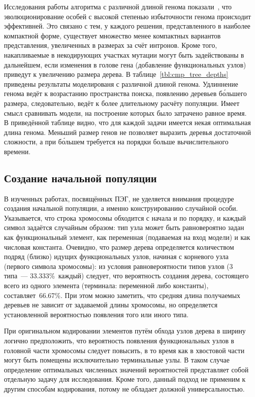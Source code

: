 Исследования работы алгоритма с различной длиной генома показали~\cite{journals/advcs/Ferreira02}, что эволюционирование особей с высокой степенью избыточности генома происходит эффективней. Это связано с тем, у каждого решения, представленного в наиболее компактной форме, существует множество менее компактных вариантов представления, увеличенных в размерах за счёт интронов. Кроме того, накапливаемые в некодирующих участках мутации могут быть задействованы в дальнейшем, если изменения в голове гена (добавление функциональных узлов) приведут к увеличению размера дерева. В таблице~\ref{tbl:cmp_tree_depths} приведены результаты моделированя с различной длиной генома. Удлиннение генома ведёт к возрастанию пространства поиска, появлению деревьев б\'{о}льшего размера, следовательно, ведёт к более длительному расчёту популяции. Имеет смысл сравнивать модели, на построение которых было затрачено равное время. В приведённой таблице видно, что для каждой задачи имеется некая оптимальная длина генома. Меньший размер генов не позволяет выразить деревья достаточной сложности, а при б\'{о}льшем требуется на порядки больше вычислительного времени.






\subsection{Создание начальной популяции}

В изученных работах, посвящённых ПЭГ, не уделяется внимания процедуре создания начальной популяции, а именно конструированию случайной особи. Указывается, что строка хромосомы обходится с начала и по порядку, и каждый символ задаётся случайным образом: тип узла может быть равновероятно задан как функциональный элемент, как переменная (подаваемая на вход модели) и как числовая константа. Очевидно, что размер дерева определяется количеством подряд (близко) идущих функциональных узлов, начиная с корневого узла (первого символа хромосомы): из условия равновероятности типов узлов (3 типа~--- 33.333\%~каждый) следует, что вероятность создания дерева, состоящего всего из одного элемента (терминала: переменной либо константы), составляет~66.67\%. При этом можно заметить, что средняя длина получаемых деревьев не зависит от задаваемой длины хромосомы, но определяется установленной вероятностью появления того или иного типа.

При оригинальном кодировании элементов путём обхода узлов дерева в ширину логично предположить, что вероятность появления функциональных узлов в головной части хромосомы следует повысить, в то время как в хвостовой части могут быть помещены исключительно терминальные узлы. В таком случае определение оптимальных численных значений вероятностей представляет собой отдельную задачу для исследования. Кроме того, данный подход не применим к другим способам кодирования, потому не обладает должной универсальностью.

